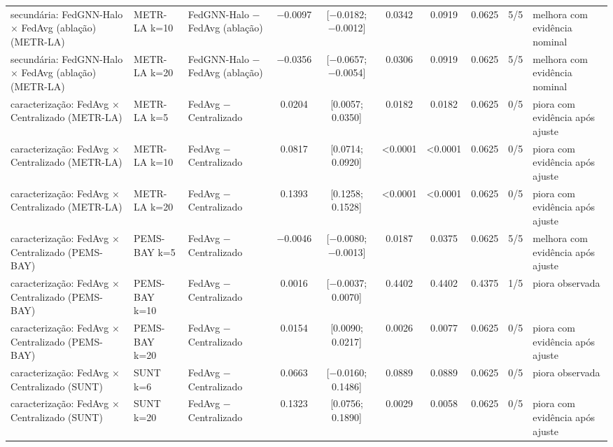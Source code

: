 \begin{tabular}{lllccccccl}
secundária: FedGNN-Halo × FedAvg (ablação) (METR-LA) & METR-LA k=10 & FedGNN-Halo − FedAvg (ablação) & \num{-0.0097} & [\num{-0.0182}; \num{-0.0012}] & \num{0.0342} & \num{0.0919} & \num{0.0625} & 5/5 & melhora com evidência nominal \\
secundária: FedGNN-Halo × FedAvg (ablação) (METR-LA) & METR-LA k=20 & FedGNN-Halo − FedAvg (ablação) & \num{-0.0356} & [\num{-0.0657}; \num{-0.0054}] & \num{0.0306} & \num{0.0919} & \num{0.0625} & 5/5 & melhora com evidência nominal \\
caracterização: FedAvg × Centralizado (METR-LA) & METR-LA k=5 & FedAvg − Centralizado & \num{+0.0204} & [\num{+0.0057}; \num{+0.0350}] & \num{0.0182} & \num{0.0182} & \num{0.0625} & 0/5 & piora com evidência após ajuste \\
caracterização: FedAvg × Centralizado (METR-LA) & METR-LA k=10 & FedAvg − Centralizado & \num{+0.0817} & [\num{+0.0714}; \num{+0.0920}] & \num{<0.0001} & \num{<0.0001} & \num{0.0625} & 0/5 & piora com evidência após ajuste \\
caracterização: FedAvg × Centralizado (METR-LA) & METR-LA k=20 & FedAvg − Centralizado & \num{+0.1393} & [\num{+0.1258}; \num{+0.1528}] & \num{<0.0001} & \num{<0.0001} & \num{0.0625} & 0/5 & piora com evidência após ajuste \\
caracterização: FedAvg × Centralizado (PEMS-BAY) & PEMS-BAY k=5 & FedAvg − Centralizado & \num{-0.0046} & [\num{-0.0080}; \num{-0.0013}] & \num{0.0187} & \num{0.0375} & \num{0.0625} & 5/5 & melhora com evidência após ajuste \\
caracterização: FedAvg × Centralizado (PEMS-BAY) & PEMS-BAY k=10 & FedAvg − Centralizado & \num{+0.0016} & [\num{-0.0037}; \num{+0.0070}] & \num{0.4402} & \num{0.4402} & \num{0.4375} & 1/5 & piora observada \\
caracterização: FedAvg × Centralizado (PEMS-BAY) & PEMS-BAY k=20 & FedAvg − Centralizado & \num{+0.0154} & [\num{+0.0090}; \num{+0.0217}] & \num{0.0026} & \num{0.0077} & \num{0.0625} & 0/5 & piora com evidência após ajuste \\
caracterização: FedAvg × Centralizado (SUNT) & SUNT k=6 & FedAvg − Centralizado & \num{+0.0663} & [\num{-0.0160}; \num{+0.1486}] & \num{0.0889} & \num{0.0889} & \num{0.0625} & 0/5 & piora observada \\
caracterização: FedAvg × Centralizado (SUNT) & SUNT k=20 & FedAvg − Centralizado & \num{+0.1323} & [\num{+0.0756}; \num{+0.1890}] & \num{0.0029} & \num{0.0058} & \num{0.0625} & 0/5 & piora com evidência após ajuste \\

\end{tabular}
